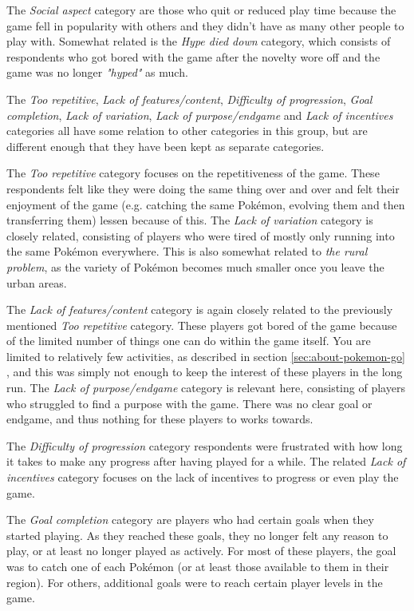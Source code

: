 The \emph{Social aspect} category are those who quit or reduced play time because the game fell in popularity with others and they didn't have as many other people to play with. Somewhat related is the \emph{Hype died down} category, which consists of respondents who got bored with the game after the novelty wore off and the game was no longer \emph{"hyped"} as much.

The \emph{Too repetitive}, \emph{Lack of features/content}, \emph{Difficulty of progression}, \emph{Goal completion}, \emph{Lack of variation}, \emph{Lack of purpose/endgame} and \emph{Lack of incentives} categories all have some relation to other categories in this group, but are different enough that they have been kept as separate categories. 

The \emph{Too repetitive} category focuses on the repetitiveness of the game. These respondents felt like they were doing the same thing over and over and felt their enjoyment of the game (e.g. catching the same Pokémon, evolving them and then transferring them) lessen because of this. The \emph{Lack of variation} category is closely related, consisting of players who were tired of mostly only running into the same Pokémon everywhere. This is also somewhat related to \emph{the rural problem}, as the variety of Pokémon becomes much smaller once you leave the urban areas.

The \emph{Lack of features/content} category is again closely related to the previously mentioned \emph{Too repetitive} category. These players got bored of the game because of the limited number of things one can do within the game itself. You are limited to relatively few activities, as described in section \ref{sec:about-pokemon-go} , and this was simply not enough to keep the interest of these players in the long run. The \emph{Lack of purpose/endgame} category is relevant here, consisting of players who struggled to find a purpose with the game. There was no clear goal or endgame, and thus nothing for these players to works towards.

The \emph{Difficulty of progression} category respondents were frustrated with how long it takes to make any progress after having played for a while. The related \emph{Lack of incentives} category focuses on the lack of incentives to progress or even play the game.

The \emph{Goal completion} category are players who had certain goals when they started playing. As they reached these goals, they no longer felt any reason to play, or at least no longer played as actively. For most of these players, the goal was to catch one of each Pokémon (or at least those available to them in their region). For others, additional goals were to reach certain player levels in the game.

